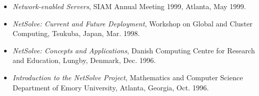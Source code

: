 \documentclass[times,11pt]{letter}
\begin{document}
\begin{itemize}
\item[-] {\it Network-enabled Servers}, SIAM Annual Meeting 1999, Atlanta,
May 1999.

\item[-] {\it NetSolve: Current and Future Deployment}, Workshop on
Global and Cluster Computing, Tsukuba, Japan, Mar. 1998.

\item[-] {\it NetSolve: Concepts and Applications}, Danish Computing
Centre for Research and Education, Lungby, Denmark, Dec. 1996.

\item[-] {\it Introduction to the NetSolve Project}, Mathematics and
Computer Science Department of Emory University, Atlanta, Georgia, Oct. 1996.

\end{itemize}
\end{document}
